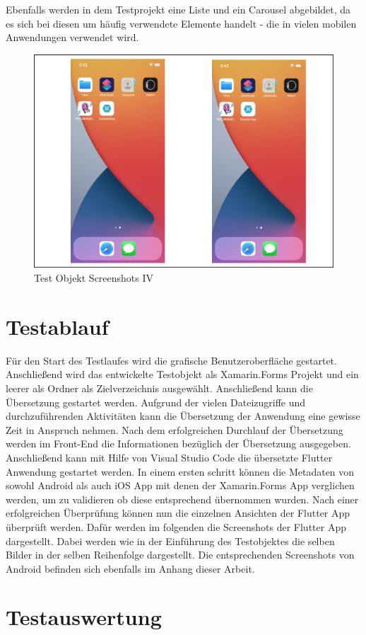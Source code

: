 Ebenfalls werden in dem Testprojekt eine Liste und ein Carousel abgebildet,  da es sich bei diesen um häufig verwendete Elemente handelt - die in vielen mobilen Anwendungen verwendet wird. 

\begin{figure}[!ht]
 \includegraphics[width=\textwidth,keepaspectratio]{Images/Screenshot/AppIconAndMenu.png}
 \caption{Test Objekt Screenshots IV}
 \label{fig:TestObjectIV}
\end{figure}




\section{Testablauf}
Für den Start des Testlaufes wird die grafische Benutzeroberfläche gestartet. Anschließend wird das entwickelte Testobjekt als Xamarin.Forms Projekt und ein leerer als Ordner als Zielverzeichnis ausgewählt. Anschließend kann die Übersetzung gestartet werden.  Aufgrund der vielen Dateizugriffe und durchzuführenden Aktivitäten kann die Übersetzung der Anwendung eine gewisse Zeit in Anspruch nehmen. 
Nach dem erfolgreichen Durchlauf der Übersetzung werden im Front-End die Informationen bezüglich der Übersetzung ausgegeben.  
Anschließend kann mit Hilfe von Visual Studio Code die übersetzte Flutter Anwendung gestartet werden.  In einem ersten schritt können die Metadaten von sowohl Android als auch iOS App mit denen der Xamarin.Forms App verglichen werden, um zu validieren ob diese entsprechend übernommen wurden.
Nach einer erfolgreichen Überprüfung können nun die einzelnen Ansichten der Flutter App überprüft werden.  Dafür werden im folgenden die Screenshots der Flutter App dargestellt.  Dabei werden wie in der Einführung des Testobjektes die selben Bilder in der selben Reihenfolge dargestellt.  Die entsprechenden Screenshots von Android befinden sich ebenfalls im Anhang dieser Arbeit. 



\section{Testauswertung}

